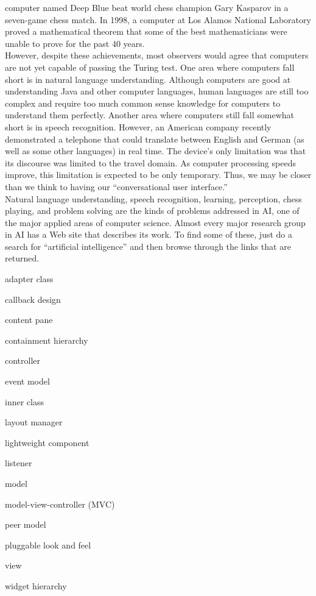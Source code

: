 computer named Deep Blue beat world chess champion
Gary Kasparov in a seven-game chess match. In 1998, a computer
at Los Alamos National Laboratory proved a mathematical theorem
that some of the best mathematicians were unable to prove
for the past 40 years.\\
\hspace*{1pc}However, despite these achievements, most observers would agree that
computers are not yet capable of passing the Turing test. One area
where computers fall short is in natural language
understanding. Although computers are good at understanding Java and
other computer languages, human languages are still too complex and
require too much common sense knowledge for computers to understand
them perfectly. Another area where computers still fall somewhat short
is in speech recognition. However, an American company recently
demonstrated a telephone that could translate between English and
German (as well as some other languages) in real time.  The device's
only limitation was that its discourse was limited to the travel
domain.  As computer processing speeds improve, this limitation is
expected to be only temporary.  Thus, we may be closer than we think
to having our ``conversational user interface.''\\
\hspace*{1pc}Natural language understanding, speech recognition, learning,
perception, chess playing, and problem solving are the kinds of
problems addressed in AI, one of the major applied areas of computer
science. Almost every major research group in AI has a Web site that
describes its work. To find some of these, just do a search for
``artificial intelligence'' and then browse through the links that
are returned.

\pagebreak
{}
\label{chapter-summary}

\nopagebreak{}
\label{technical-terms}

\begin{KT}
adapter class

callback design

content pane

containment hierarchy

controller

event model

inner class

layout manager

lightweight  component

listener

model

model-view-controller (MVC)

peer model

pluggable look and feel

view

widget hierarchy

\end{KT}


